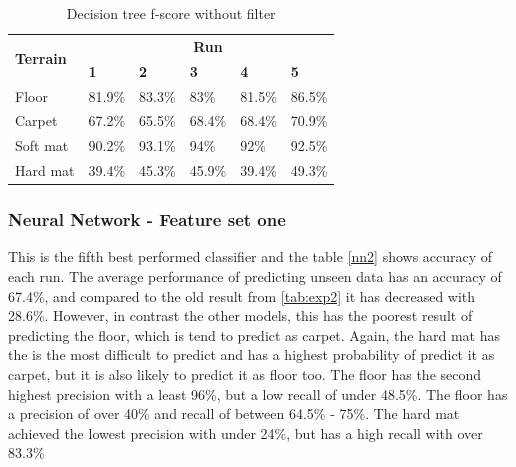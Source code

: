 \documentclass[USenglish]{ifimaster}  %
\begin{document}
	\begin{table}[h]
		\centering
		\begin{tabular}{@{}llllll@{}}
			\toprule
			\multirow{2}{*}{\textbf{Terrain}} & \multicolumn{5}{c}{\textbf{Run}} \\ \cmidrule(l){2-6} 
			& \multicolumn{1}{l|}{\textbf{1}} & \multicolumn{1}{l|}{\textbf{2}} & \multicolumn{1}{l|}{\textbf{3}} & \multicolumn{1}{l|}{\textbf{4}} & \textbf{5} \\ \midrule
			\multicolumn{1}{l|}{Floor} & \multicolumn{1}{l|}{81.9\%} & \multicolumn{1}{l|}{83.3\%} & \multicolumn{1}{l|}{83\%} & \multicolumn{1}{l|}{81.5\%} & 86.5\% \\ \midrule
			\multicolumn{1}{l|}{Carpet} & \multicolumn{1}{l|}{67.2\%} & \multicolumn{1}{l|}{65.5\%} & \multicolumn{1}{l|}{68.4\%} & \multicolumn{1}{l|}{68.4\%} & 70.9\% \\ \midrule
			\multicolumn{1}{l|}{Soft mat} & \multicolumn{1}{l|}{90.2\%} & \multicolumn{1}{l|}{93.1\%} & \multicolumn{1}{l|}{94\%} & \multicolumn{1}{l|}{92\%} & 92.5\% \\ \midrule
			\multicolumn{1}{l|}{Hard mat} & \multicolumn{1}{l|}{39.4\%} & \multicolumn{1}{l|}{45.3\%} & \multicolumn{1}{l|}{45.9\%} & \multicolumn{1}{l|}{39.4\%} & 49.3\% \\ \bottomrule
		\end{tabular}
		\caption{Decision tree f-score without filter}
		\label{dtfscore}
	\end{table}
	\FloatBarrier
	\newpage
	
\subsubsection{Neural Network - Feature set one}
This is the fifth best performed classifier and the table \ref{nn2} shows accuracy of each run. The average performance of predicting unseen data has an accuracy of 67.4\%, and compared to the old result from \ref{tab:exp2} it has decreased with 28.6\%. However, in contrast the other models, this has the poorest result of predicting the floor, which is tend to predict as carpet. Again, the hard mat has the is the most difficult to predict and has a highest probability of predict it as carpet, but it is also likely to predict it as floor too. The floor has the second highest precision with a least 96\%, but a low recall of under 48.5\%. The floor has a precision of over 40\% and recall of between 64.5\% - 75\%. The hard mat achieved the lowest precision with under 24\%, but has a high recall with over 83.3\%
		
\end{document}
